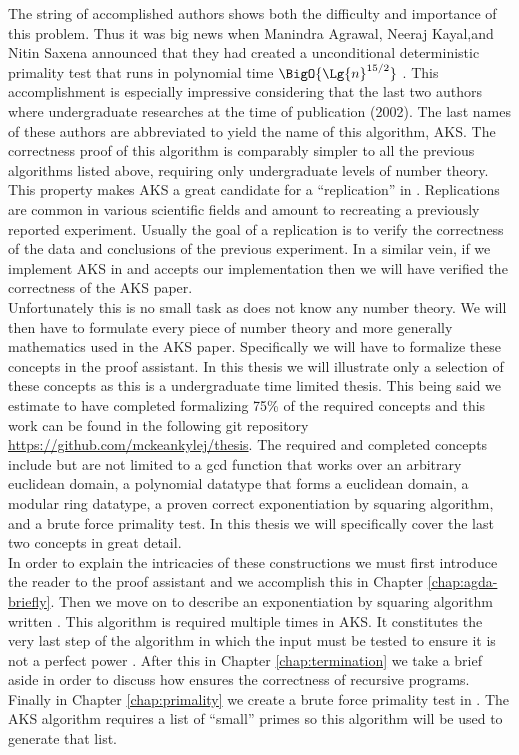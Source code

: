 \documentclass[./Thesis.tex]{subfiles}
\begin{document}
The string of accomplished authors shows both the difficulty and importance of this
problem. Thus it was big news when Manindra Agrawal, Neeraj Kayal,and Nitin
Saxena announced that they had created a unconditional deterministic
primality test that runs in polynomial time $\BigO{\Lg{n}^{15/2}}$ \cite{aks}.
This accomplishment is especially impressive considering that the last two
authors where undergraduate researches at the time of publication (2002). The
last names of these authors are abbreviated to yield the name of this algorithm,
AKS. The correctness proof of this algorithm is comparably simpler to all the
previous algorithms listed above, requiring only undergraduate levels of number
theory. This property makes AKS a great candidate for a ``replication'' in
\Agda{}. Replications are common in various scientific fields and amount to
recreating a previously reported experiment. Usually the goal of a replication
is to verify the correctness of the data and conclusions of the previous
experiment. In a similar vein, if we implement AKS in \Agda{} and \Agda{}
accepts our implementation then we will have verified the correctness of the AKS
paper. \\

Unfortunately this is no small task as \Agda{} does not know any number theory.
We will then have to formulate every piece of number theory and more generally
mathematics used in the AKS paper. Specifically we will have to formalize these
concepts in the \Agda{} proof assistant. In this thesis we will illustrate only
a selection of these concepts as this is a undergraduate time limited thesis.
This being said we estimate to have completed formalizing 75\% of the required
concepts and this work can be found in the following git repository
\url{https://github.com/mckeankylej/thesis}. The required and completed concepts
include but are not limited to a gcd function that works over an arbitrary
euclidean domain, a polynomial datatype that forms a euclidean domain,
a modular ring datatype, a proven correct exponentiation by squaring algorithm,
and a brute force primality test. In this thesis we will specifically cover the
last two concepts in great detail. \\

In order to explain the intricacies of these constructions we must first
introduce the reader to the \Agda{} proof assistant and we accomplish this in
Chapter \ref{chap:agda-briefly}. Then we move on to describe an exponentiation
by squaring algorithm written \Agda{}. This algorithm is required multiple times
in AKS. It constitutes the very last step of the algorithm in which the input
must be tested to ensure it is not a perfect power \cite{smid}. After this in
Chapter \ref{chap:termination} we take a brief aside in order to discuss how
\Agda{} ensures the correctness of recursive programs. Finally in Chapter
\ref{chap:primality} we create a brute force primality test in \Agda{}. The AKS
algorithm requires a list of ``small'' primes so this algorithm will be used to
generate that list.
\end{document}
